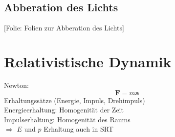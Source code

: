 \documentclass[titlepage,11pt,a4paper,ngerman]{report}
\newcommand{\folie}[1]{\color{gray}[Folie: #1]\color{black}}
\renewcommand{\vec}[1]{\boldsymbol{#1}}
\begin{document}
\subsection{Abberation des Lichts}

\folie{Folien zur Abberation des Lichts}

\section{Relativistische Dynamik}
Newton: \begin{equation*}
\vec{F} = m \vec{a}
\end{equation*}
Erhaltungssätze (Energie, Impuls, Drehimpuls)\\[5pt]
Energieerhaltung: Homogenität der Zeit\\
Impulserhaltung: Homogenität des Raums\\[5pt]
$ \Rightarrow $ $ E $ und $ p $ Erhaltung auch in SRT
\end{document}

